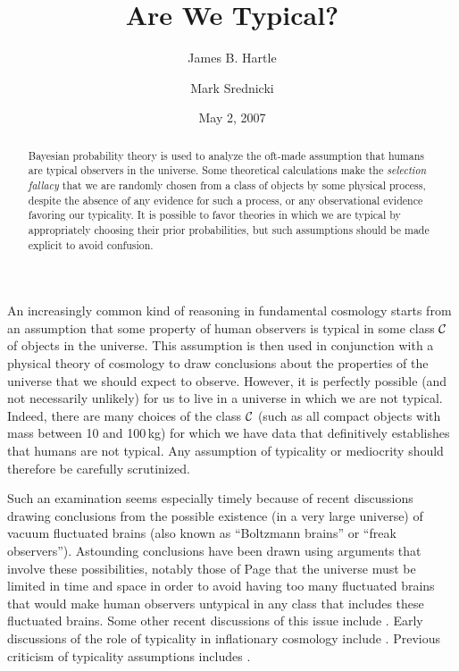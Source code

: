 \documentclass[pra,twocolumn,nofootinbib,eqsecnum,floatfix]{revtex4}
\begin{document}
\title{Are We Typical?}

\author{James B. Hartle}

\author{Mark Srednicki}


\date{May 2, 2007}

\begin{abstract}

Bayesian probability theory is used to analyze the oft-made assumption that humans are typical observers in the universe.  Some theoretical calculations make the {\it selection fallacy\/} that we are randomly chosen from a class of objects by some physical process, despite the absence of any evidence for such a process, or any observational evidence favoring our typicality.  It is possible to favor theories in which we are typical by appropriately choosing their  prior probabilities, but such assumptions should be made explicit to avoid confusion. 

\end{abstract}


\maketitle

An increasingly common kind of reasoning in fundamental cosmology starts from an assumption
that some property of human observers is typical in some class $\cal C$ of objects in the universe. 
This assumption is then used in conjunction with a physical theory of cosmology to draw conclusions about the properties of the universe that we should expect to observe. However,  it is perfectly possible 
(and not necessarily unlikely) for us to live in a universe in which we are not typical.  
Indeed, there are many choices of the class $\cal C$ (such as all compact objects with mass between 10 and 100$\,$kg) for which we have data that definitively establishes that humans are not typical.  Any assumption of typicality or mediocrity should therefore be carefully scrutinized. 

Such an examination seems especially timely because of recent discussions drawing conclusions from the possible existence (in a very large universe) of vacuum fluctuated brains (also known as ``Boltzmann brains'' or ``freak observers''). Astounding conclusions have been drawn using arguments that involve these possibilities, notably those of Page \cite{Page06a,Page06b,Page06c,Page06d} that the universe must be limited in time and space 
in order to avoid having too many fluctuated brains that would make 
human observers untypical in any class that includes these fluctuated brains.  
Some other recent discussions of this issue include \cite{DKS02,BF06,Linde06,Vil06,Banks07}.  
Early discussions of the role of typicality in inflationary cosmology include \cite{BLL94,Vil95}.
Previous criticism of typicality assumptions includes \cite{Smo04,Neal06}.
\end{document}
